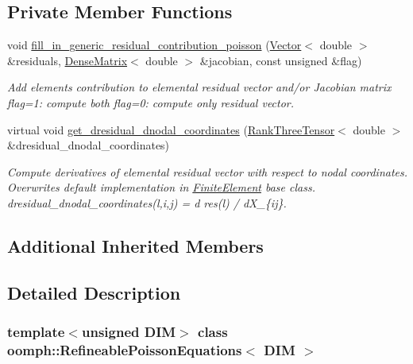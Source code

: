 \subsection*{Private Member Functions}
\begin{DoxyCompactItemize}
\item 
void \hyperlink{classoomph_1_1RefineablePoissonEquations_a1cea3422561cd3016aa4cc04c0e5be56}{fill\+\_\+in\+\_\+generic\+\_\+residual\+\_\+contribution\+\_\+poisson} (\hyperlink{classoomph_1_1Vector}{Vector}$<$ double $>$ \&residuals, \hyperlink{classoomph_1_1DenseMatrix}{Dense\+Matrix}$<$ double $>$ \&jacobian, const unsigned \&flag)
\begin{DoxyCompactList}\small\item\em Add element\textquotesingle{}s contribution to elemental residual vector and/or Jacobian matrix flag=1\+: compute both flag=0\+: compute only residual vector. \end{DoxyCompactList}\item 
virtual void \hyperlink{classoomph_1_1RefineablePoissonEquations_a1cb1cf52a2332954f69199c7e0c219b4}{get\+\_\+dresidual\+\_\+dnodal\+\_\+coordinates} (\hyperlink{classoomph_1_1RankThreeTensor}{Rank\+Three\+Tensor}$<$ double $>$ \&dresidual\+\_\+dnodal\+\_\+coordinates)
\begin{DoxyCompactList}\small\item\em Compute derivatives of elemental residual vector with respect to nodal coordinates. Overwrites default implementation in \hyperlink{classoomph_1_1FiniteElement}{Finite\+Element} base class. dresidual\+\_\+dnodal\+\_\+coordinates(l,i,j) = d res(l) / d\+X\+\_\+\{ij\}. \end{DoxyCompactList}\end{DoxyCompactItemize}
\subsection*{Additional Inherited Members}


\subsection{Detailed Description}
\subsubsection*{template$<$unsigned D\+IM$>$\newline
class oomph\+::\+Refineable\+Poisson\+Equations$<$ D\+I\+M $>$}

